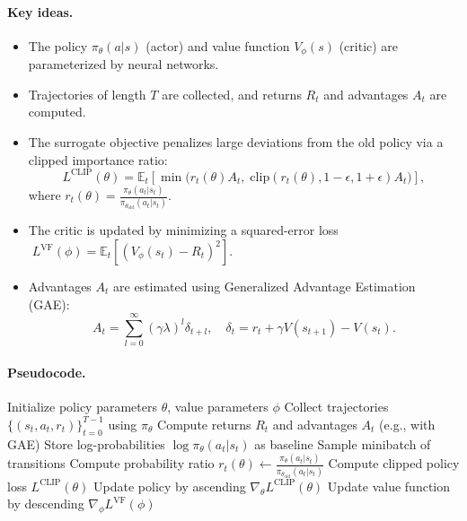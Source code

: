 \paragraph{Key ideas.}
\begin{itemize}
    \item The policy $\pi_\theta(a|s)$ (actor) and value function $V_\phi(s)$ (critic) are parameterized by neural networks.
    \item Trajectories of length $T$ are collected, and returns $R_t$ and advantages $A_t$ are computed.
    \item The surrogate objective penalizes large deviations from the old policy via a clipped importance ratio:
    \[
        L^{\text{CLIP}}(\theta) = \mathbb{E}_t\!\left[
            \min\Big(r_t(\theta) A_t,\;
            \mathrm{clip}\!\left(r_t(\theta), 1-\epsilon, 1+\epsilon\right) A_t
            \Big)
        \right],
    \]
    where $r_t(\theta) = \tfrac{\pi_\theta(a_t|s_t)}{\pi_{\theta_{\text{old}}}(a_t|s_t)}$.
    \item The critic is updated by minimizing a squared-error loss 
    $\;L^{\text{VF}}(\phi) = \mathbb{E}_t\!\left[(V_\phi(s_t) - R_t)^2\right]$.
    \item Advantages $A_t$ are estimated using Generalized Advantage Estimation (GAE):
    \[
        A_t = \sum_{l=0}^\infty (\gamma \lambda)^l \delta_{t+l},
        \quad 
        \delta_t = r_t + \gamma V(s_{t+1}) - V(s_t).
    \]
\end{itemize}

\paragraph{Pseudocode.}

\begin{algorithm}[H]
\caption{Proximal Policy Optimization (PPO, clipped variant)}
\begin{algorithmic}
\State Initialize policy parameters $\theta$, value parameters $\phi$
    \State Collect trajectories $\{(s_t,a_t,r_t)\}_{t=0}^{T-1}$ using $\pi_\theta$
    \State Compute returns $R_t$ and advantages $A_t$ (e.g., with GAE)
    \State Store log-probabilities $\log \pi_\theta(a_t|s_t)$ as baseline
        \State Sample minibatch of transitions
        \State Compute probability ratio $r_t(\theta) \gets \tfrac{\pi_\theta(a_t|s_t)}{\pi_{\theta_{\text{old}}}(a_t|s_t)}$
        \State Compute clipped policy loss $L^{\text{CLIP}}(\theta)$
        \State Update policy by ascending $\nabla_\theta L^{\text{CLIP}}(\theta)$
        \State Update value function by descending $\nabla_\phi L^{\text{VF}}(\phi)$
    \EndFor
\EndFor
\end{algorithmic}
\end{algorithm}
